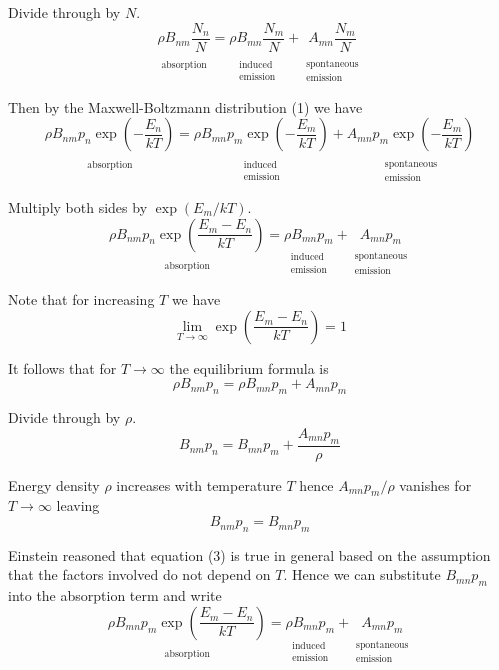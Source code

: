 \documentclass[12pt]{article}
\newcommand\BNM{B_{nm}} %
\newcommand\BMN{B_{mn}} %
\newcommand\AMN{A_{mn}} %
\newcommand\RHO{\rho}
\newcommand\ABSORPTION{\substack{\\[1ex] \text{absorption}}}
\newcommand\INDUCED{\substack{\\[1ex] \text{induced}\\ \text{emission}}}
\newcommand\SPONTANEOUS{\substack{\\[1ex] \text{spontaneous}\\ \text{emission}}}
\begin{document}
Divide through by $N$.
\begin{equation*}
\underset{\ABSORPTION}{\RHO\BNM \frac{N_n}{N}}
=\underset{\INDUCED}{\RHO\BMN \frac{N_m}{N}}
+\underset{\SPONTANEOUS}{\AMN \frac{N_m}{N}}
\end{equation*}

Then by the Maxwell-Boltzmann distribution (1) we have
\begin{equation*}
\underset{\ABSORPTION}{\RHO\BNM p_n\exp\left(-\frac{E_n}{kT}\right)}
=\underset{\INDUCED}{\RHO\BMN p_m\exp\left(-\frac{E_m}{kT}\right)}
+\underset{\SPONTANEOUS}{\AMN p_m\exp\left(-\frac{E_m}{kT}\right)}
\tag{2}
\end{equation*}

Multiply both sides by $\exp(E_m/kT)$.
\begin{equation*}
\underset{\ABSORPTION}{\RHO\BNM p_n\exp\left(\frac{E_m-E_n}{kT}\right)}
=\underset{\INDUCED}{\RHO\BMN p_m}
+\underset{\SPONTANEOUS}{\AMN p_m}
\end{equation*}

Note that for increasing $T$ we have
\begin{equation*}
\lim_{T\rightarrow\infty}\exp\left(\frac{E_m-E_n}{kT}\right)=1
\end{equation*}

It follows that for $T\rightarrow\infty$ the equilibrium formula is
\begin{equation*}
\RHO\BNM p_n
=\RHO\BMN p_m
+\AMN p_m
\end{equation*}

Divide through by $\RHO$.
\begin{equation*}
\BNM p_n=\BMN p_m+\frac{\AMN p_m}{\RHO}
\end{equation*}

Energy density $\RHO$ increases with temperature $T$
hence $\AMN p_m/\RHO$ vanishes for $T\rightarrow\infty$ leaving
\begin{equation*}
\BNM p_n=\BMN p_m
\tag{3}
\end{equation*}

Einstein reasoned that equation (3) is true in general based on the assumption that
the factors involved do not depend on $T$.
Hence we can substitute $B_{mn}p_m$ into the absorption term and write
\begin{equation*}
\underset{\ABSORPTION}{\RHO\BMN p_m\exp\left(\frac{E_m-E_n}{kT}\right)}
=\underset{\INDUCED}{\RHO\BMN p_m}
+\underset{\SPONTANEOUS}{\AMN p_m}
\end{equation*}
\end{document}
